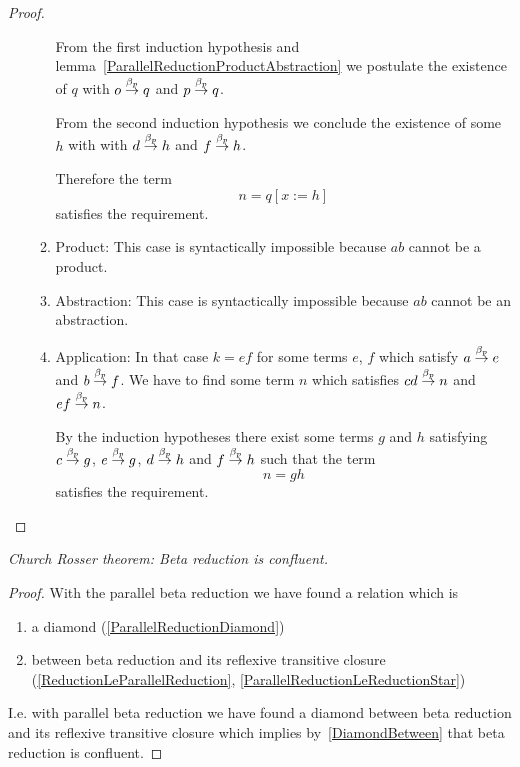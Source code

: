 \begin{theorem}
\begin{proof}
\begin{enumerate}
\begin{enumerate}
            From the first induction hypothesis and
            lemma~\ref{ParallelReductionProductAbstraction} we postulate the
            existence of $q$ with $o \stackrel{\beta_p}{\to} q$ and $p \stackrel{\beta_p}{\to} q$.

            From the second induction hypothesis we conclude the existence of
            some $h$ with with $d \stackrel{\beta_p}{\to} h$ and $f \stackrel{\beta_p}{\to} h$.

            Therefore the term
            $$
                n = q[x:=h]
            $$ satisfies the requirement.

            \item Product: This case is syntactically impossible because $a b$
            cannot be a product.

            \item Abstraction: This case is syntactically impossible because $a b$
            cannot be an abstraction.

            \item Application: In that case $k = e f$ for some terms $e$, $f$ which
            satisfy $a \stackrel{\beta_p}{\to} e$ and $b \stackrel{\beta_p}{\to} f$. We have to find some term
            $n$ which satisfies $c d \stackrel{\beta_p}{\to} n$ and $ e f \stackrel{\beta_p}{\to} n$.

            By the induction hypotheses there exist some terms $g$ and $h$
            satisfying $c \stackrel{\beta_p}{\to} g$, $e \stackrel{\beta_p}{\to} g$, $d \stackrel{\beta_p}{\to} h$ and $f
            \stackrel{\beta_p}{\to} h$ such that the term
            $$
                n = g h
            $$
            satisfies the requirement.
            \end{enumerate}
        \end{enumerate}
    \end{proof}
\end{theorem}



\begin{theorem}
    \label{ChurchRosser}
    \emph{Church Rosser theorem: Beta reduction is confluent.}

    \begin{proof}
        With the parallel beta reduction we have found a relation which is
        \begin{enumerate}
            \item a diamond (\ref{ParallelReductionDiamond})

            \item between beta reduction and its reflexive transitive closure
                (\ref{ReductionLeParallelReduction},
                \ref{ParallelReductionLeReductionStar})
        \end{enumerate}

        I.e. with parallel beta reduction we have found a diamond between beta
        reduction and its reflexive transitive closure which implies
        by~\ref{DiamondBetween} that beta reduction is confluent.
    \end{proof}
\end{theorem}



